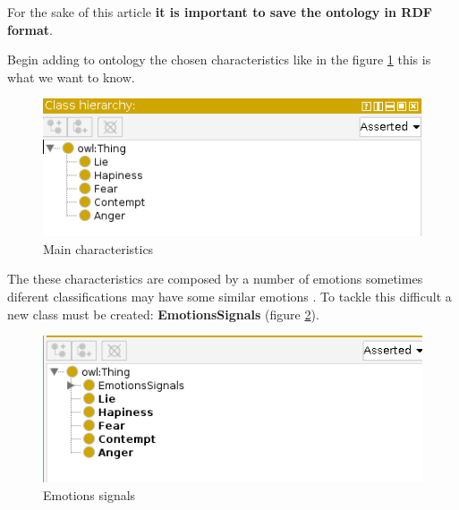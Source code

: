 \documentclass[conference]{IEEEtran}
\begin{document}
For the sake of this article \textbf{it is important to save the ontology in RDF format}.

Begin adding to ontology the chosen characteristics like in the figure \ref{fig:maincharac} this is what we want to know.
\begin{figure}[bpht]
	\centering
	\includegraphics[width=0.7\linewidth]{mainCharac}
	\caption{Main characteristics}
	\label{fig:maincharac}
\end{figure}
The these characteristics are composed by a number of emotions sometimes diferent classifications may have some similar emotions \cite{ekman2001telling}. To tackle this difficult a new class must be created: \textbf{EmotionsSignals} (figure \ref{fig:emotinalSinals}). 
\begin{figure}[bpht]
	\centering
	\includegraphics[width=0.7\linewidth]{emotinalSinals}
	\caption{Emotions signals}
	\label{fig:emotinalSinals}
\end{figure}
\end{document}
